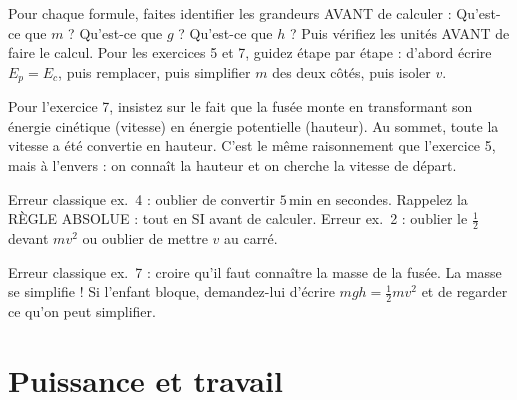 \documentclass[11pt,a4paper]{article}
\newcommand{\tipbox}[1]{
\begin{tcolorbox}[colback=tipblue!8!white,colframe=tipblue!60!black,title=\textbf{Comment expliquer}]
#1
\end{tcolorbox}
}
\newcommand{\warnbox}[1]{
\begin{tcolorbox}[colback=warnred!8!white,colframe=warnred!60!black,title=\textbf{Erreurs fr\'equentes}]
#1
\end{tcolorbox}
}
\begin{document}
\tipbox{
Pour chaque formule, faites identifier les grandeurs AVANT de calculer : \guillemotleft{} Qu'est-ce que $m$ ? Qu'est-ce que $g$ ? Qu'est-ce que $h$ ? \guillemotright{} Puis v\'erifiez les unit\'es AVANT de faire le calcul. Pour les exercices 5 et 7, guidez \'etape par \'etape : d'abord \'ecrire $E_p = E_c$, puis remplacer, puis simplifier $m$ des deux c\^ot\'es, puis isoler $v$.

\vspace{0.2cm}
Pour l'exercice 7, insistez sur le fait que la fus\'ee monte en transformant son \'energie cin\'etique (vitesse) en \'energie potentielle (hauteur). Au sommet, toute la vitesse a \'et\'e convertie en hauteur. C'est le m\^eme raisonnement que l'exercice 5, mais \guillemotleft{} \`a l'envers \guillemotright{} : on conna\^it la hauteur et on cherche la vitesse de d\'epart.
}

\warnbox{
Erreur classique ex.~4 : oublier de convertir $5\,\text{min}$ en secondes. Rappelez la R\`EGLE ABSOLUE : tout en SI avant de calculer. Erreur ex.~2 : oublier le $\frac{1}{2}$ devant $mv^{2}$ ou oublier de mettre $v$ au carr\'e.

\vspace{0.2cm}
Erreur classique ex.~7 : croire qu'il faut conna\^itre la masse de la fus\'ee. La masse se simplifie ! Si l'enfant bloque, demandez-lui d'\'ecrire $mgh = \frac{1}{2}mv^{2}$ et de regarder ce qu'on peut simplifier.
}

\section{Puissance et travail}
\end{document}
